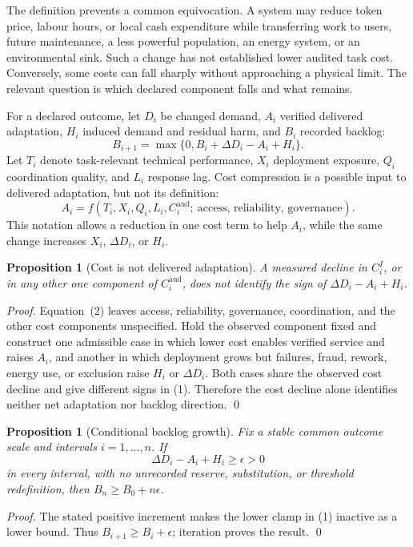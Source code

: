 \documentclass[11pt]{article}
\newtheorem{proposition}[definition]{Proposition}
\begin{document}
The definition prevents a common equivocation. A system may reduce token price,
labour hours, or local cash expenditure while transferring work to users,
future maintenance, a less powerful population, an energy system, or an
environmental sink. Such a change has not established lower audited task cost.
Conversely, some costs can fall sharply without approaching a physical limit.
The relevant question is which declared component falls and what remains.

For a declared outcome, let $D_i$ be changed demand, $A_i$ verified delivered
adaptation, $H_i$ induced demand and residual harm, and $B_i$ recorded backlog:
\[
 B_{i+1}=\max\{0,B_i+\Delta D_i-A_i+H_i\}.\tag{1}
\]
Let $T_i$ denote task-relevant technical performance, $X_i$ deployment
exposure, $Q_i$ coordination quality, and $L_i$ response lag. Cost compression
is a possible input to delivered adaptation, but not its definition:
\[
 A_i=f(T_i,X_i,Q_i,L_i,C^{\mathrm{aud}}_i;\ \text{access, reliability, governance}).\tag{2}
\]
This notation allows a reduction in one cost term to help $A_i$, while the same
change increases $X_i$, $\Delta D_i$, or $H_i$.

\begin{proposition}[Cost is not delivered adaptation]\label{prop:cost-not-adaptation}
A measured decline in $C^{I}_i$, or in any other one component of
$C^{\mathrm{aud}}_i$, does not identify the sign of $\Delta D_i-A_i+H_i$.
\end{proposition}
\begin{proof}
Equation~(2) leaves access, reliability, governance, coordination, and the
other cost components unspecified. Hold the observed component fixed and
construct one admissible case in which lower cost enables verified service and
raises $A_i$, and another in which deployment grows but failures, fraud,
rework, energy use, or exclusion raise $H_i$ or $\Delta D_i$. Both cases share
the observed cost decline and give different signs in (1). Therefore the cost
decline alone identifies neither net adaptation nor backlog direction. \qed
\end{proof}

\begin{proposition}[Conditional backlog growth]\label{prop:backlog}
Fix a stable common outcome scale and intervals $i=1,\ldots,n$. If
\[
 \Delta D_i-A_i+H_i\geq\epsilon>0
\]
in every interval, with no unrecorded reserve, substitution, or threshold
redefinition, then $B_n\geq B_0+n\epsilon$.
\end{proposition}
\begin{proof}
The stated positive increment makes the lower clamp in (1) inactive as a lower
bound. Thus $B_{i+1}\geq B_i+\epsilon$; iteration proves the result. \qed
\end{proof}
\end{document}
